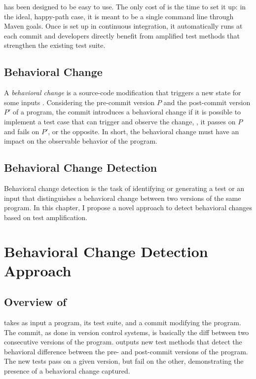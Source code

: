 \DCI has been designed to be easy to use.
The only cost of \DCI is the time to set it up: in the ideal, happy-path case, it is meant to be a single command line through Maven goals.
Once \DCI is set up in continuous integration, it automatically runs at each commit and developers directly benefit from amplified test methods that strengthen the existing test suite.

%
%
\subsection{Behavioral Change}
\label{subsec:dci:background:behavioral-change}

A \emph{behavioral change} is a source-code modification that triggers a new state for some inputs \cite{saff2004experimental}.
Considering the pre-commit version $P$ and the post-commit version $P'$ of a program, the commit introduces a behavioral change if it is possible to implement a test case that can trigger and observe the change, \ie, it passes on $P$ and fails on $P'$, or the opposite.
In short, the behavioral change must have an impact on the observable behavior of the program.

%
%
\subsection{Behavioral Change Detection}
\label{subsec:dci:background:behavioral-change-detection}

Behavioral change detection is the task of identifying or generating a test or an input that distinguishes a behavioral change between two versions of the same program.
In this chapter, I propose a novel approach to detect behavioral changes based on test amplification.


\section{Behavioral Change Detection Approach}
\label{sec:dci:techniques}

\subsection{Overview of \DCI}
\label{sec:dci:techniques:overview}

\DCI takes as input a program, its test suite, and a commit modifying the program.
The commit, as done in version control systems, is basically the diff between two consecutive versions of the program.
%
\DCI outputs new test methods that detect the behavioral difference between the pre- and post-commit versions of the program.
The new tests pass on a given version, but fail on the other, demonstrating the presence of a behavioral change captured.%

